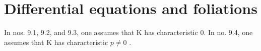 \section{Differential equations and foliations}

In nos. 9.1, 9.2, and 9.3, one assumes that K has characteristic 0. In no. 9.4, one assumes that K has characteristic \(p \neq 0\) .

